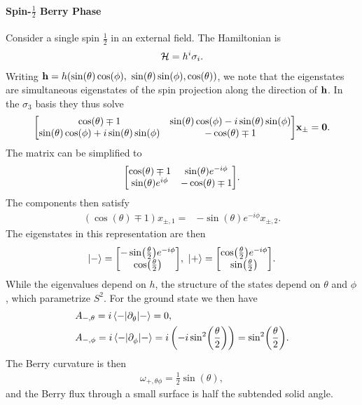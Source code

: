 \paragraph{Spin-$\frac{1}{2}$ Berry Phase}
Consider a single spin $\frac{1}{2}$ in an external field. The Hamiltonian is
\begin{align*}
	\mathcal{H} = h^{i}\sigma_{i}.
\end{align*}
Writing $\vb{h} = h(\sin(\theta)\cos(\phi),\ \sin(\theta)\sin(\phi), \cos(\theta))$, we note that the eigenstates are simultaneous eigenstates of the spin projection along the direction of $\vb{h}$. In the $\sigma_{3}$ basis they thus solve
\begin{align*}
	\mqty[
		\cos(\theta) \mp 1 & \sin(\theta)\cos(\phi) - i\sin(\theta)\sin(\phi) \\
		\sin(\theta)\cos(\phi) + i\sin(\theta)\sin(\phi) & -\cos(\theta) \mp 1
	]\vb{x}_{\pm} = \vb{0}.
\end{align*}
The matrix can be simplified to
\begin{align*}
	\mqty[
		\cos(\theta) \mp 1    & \sin(\theta)e^{-i\phi} \\
		\sin(\theta)e^{i\phi} & -\cos(\theta) \mp 1
	].
\end{align*}
The components then satisfy
\begin{align*}
	(\cos(\theta) \mp 1)x_{\pm, 1} =& -\sin(\theta)e^{-i\phi}x_{\pm, 2}.
\end{align*}
The eigenstates in this representation are then
\begin{align*}
	\ket{-} = \mqty[
		-\sin(\frac{\theta}{2})e^{-i\phi} \\
		\cos(\frac{\theta}{2})
	],\ \ket{+} = \mqty[
		\cos(\frac{\theta}{2})e^{-i\phi} \\
		\sin(\frac{\theta}{2})
	].
\end{align*}
While the eigenvalues depend on $h$, the structure of the states depend on $\theta$ and $\phi$, which parametrize $S^{2}$. For the ground state we then have
\begin{align*}
	&A_{-, \theta} = i\mel{-}{\ensuremath{\partial^{}_{\theta}}}{-} = 0, \\
	&A_{-, \phi} = i\mel{-}{\ensuremath{\partial^{}_{\phi}}}{-} = i\left(-i\sin[2](\frac{\theta}{2})\right) = \sin[2](\frac{\theta}{2}).
\end{align*}
The Berry curvature is then
\begin{align*}
	\omega_{+, \theta\phi} = \frac{1}{2}\sin(\theta),
\end{align*}
and the Berry flux through a small surface is half the subtended solid angle.

